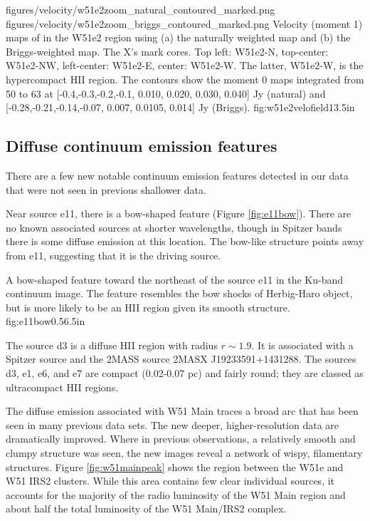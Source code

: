 \FigureTwo
{figures/velocity/w51e2zoom_natural_contoured_marked.png}
{figures/velocity/w51e2zoom_briggs_contoured_marked.png}
{Velocity (moment 1) maps of \ortho \twotwo in the W51e2 region using (a) the
naturally weighted map and (b) the Briggs-weighted map.  The X's mark
\citet{Shi2010a} cores. Top left: W51e2-N, top-center: W51e2-NW, left-center:
W51e2-E, center: W51e2-W.  The latter, W51e2-W, is the hypercompact HII region.
The contours show the moment 0 maps integrated from 50 to 63 \kms at
[-0.4,-0.3,-0.2,-0.1, 0.010, 0.020, 0.030, 0.040] Jy \kms (natural) and
[-0.28,-0.21,-0.14,-0.07, 0.007, 0.0105, 0.014] Jy \kms (Briggs).
}
{fig:w51e2velofield}{1}{3.5in}

\subsection{Diffuse continuum emission features}
\label{sec:diffuseemission}
There are a few new notable continuum emission features detected in our data
that were not seen in previous shallower data.

Near source e11, there is a bow-shaped feature (Figure \ref{fig:e11bow}).
There are no known associated sources at shorter wavelengths, though in Spitzer
bands there is some diffuse emission at this location.  The bow-like structure
points away from e11, suggesting that it is the driving source.

{A bow-shaped feature toward the northeast of the source e11 in the Ku-band
continuum image.  The feature resembles the bow shocks of Herbig-Haro object,
but is more likely to be an HII region given its smooth structure.}
{fig:e11bow}{0.5}{6.5in}

The source d3 is a diffuse HII region with radius $r\sim1.9$\arcsec.  It is
associated with a Spitzer source and the 2MASS source 2MASX J19233591+1431288.
The sources d3, e1, e6, and e7 are compact (0.02-0.07 pc) and fairly round;
they are classed as ultracompact HII regions.

The diffuse emission associated with W51 Main traces a broad arc that has been
seen in many previous data sets.  The new deeper, higher-resolution data are
dramatically improved.  Where in previous observations, a relatively smooth and
clumpy structure was seen, the new images reveal a network of wispy,
filamentary structures.  Figure \ref{fig:w51mainpeak} shows the region between
the W51e and W51 IRS2 clusters.  While this area contains few clear individual
sources, it accounts for the majority of the radio luminosity of the W51 Main
region and about half the total luminosity of the W51 Main/IRS2 complex.

